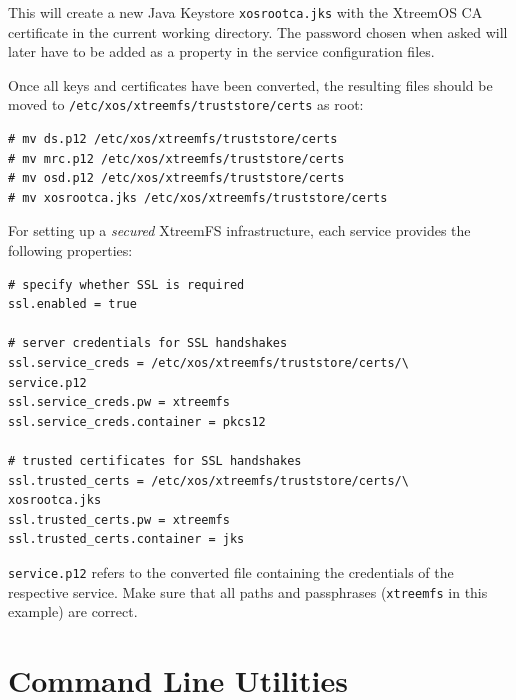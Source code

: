 \documentclass[a4paper,10pt]{book}
\begin{document}
This will create a new Java Keystore \texttt{xosrootca.jks} with the XtreemOS CA certificate in the current working directory. The password chosen when asked will later have to be added as a property in the service configuration files.

Once all keys and certificates have been converted, the resulting files should be moved to \texttt{/etc/xos/xtreemfs/truststore/certs} as root:


\begin{verbatim}
# mv ds.p12 /etc/xos/xtreemfs/truststore/certs
# mv mrc.p12 /etc/xos/xtreemfs/truststore/certs
# mv osd.p12 /etc/xos/xtreemfs/truststore/certs
# mv xosrootca.jks /etc/xos/xtreemfs/truststore/certs
\end{verbatim}


For setting up a \textit{secured} XtreemFS infrastructure, each service provides the following properties:


\begin{verbatim}
# specify whether SSL is required
ssl.enabled = true

# server credentials for SSL handshakes
ssl.service_creds = /etc/xos/xtreemfs/truststore/certs/\
service.p12
ssl.service_creds.pw = xtreemfs
ssl.service_creds.container = pkcs12

# trusted certificates for SSL handshakes
ssl.trusted_certs = /etc/xos/xtreemfs/truststore/certs/\
xosrootca.jks
ssl.trusted_certs.pw = xtreemfs
ssl.trusted_certs.container = jks
\end{verbatim}

\texttt{service.p12} refers to the converted file containing the credentials of the respective service. Make sure that all paths and passphrases (\texttt{xtreemfs} in this example) are correct.



\chapter{Command Line Utilities}
\label{sec:cli_utils}
\end{document}
